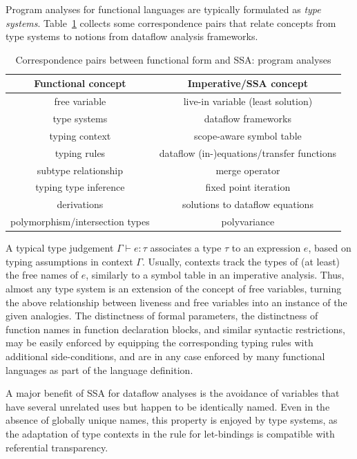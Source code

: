 Program analyses for functional languages are typically formulated as
\emph{type systems}. Table~\ref{tableFunctionalCorrespondencesII} collects some
correspondence pairs that relate concepts from type systems to notions
from dataflow analysis frameworks.
\begin{table}
\begin{center}
\begin{tabular}{|c|c|}
  \hline Functional concept & Imperative/SSA concept\\ 
  \hline 
  free variable & live-in variable (least solution)\\
  type systems & dataflow frameworks\\
  typing context & scope-aware symbol table\\
  typing
  rules & dataflow (in-)equations/transfer functions\\
  subtype relationship & merge operator\\
  typing
  type inference & fixed point iteration\\
  derivations & solutions to dataflow equations\\
  polymorphism/intersection types & polyvariance\\
  \hline
\end{tabular}
\end{center}
\caption{\label{tableFunctionalCorrespondencesII}
  Correspondence pairs between functional form and SSA: program analyses}
\end{table}
 A typical type judgement $\Gamma
\vdash e:\tau$ 
associates a type $\tau$ to an expression $e$, based on typing
assumptions in context $\Gamma$. Usually, contexts track the types of
(at least) the free names of $e$, similarly to a symbol table in an
imperative analysis. Thus, almost any type system is an extension of
the concept of free variables, turning the above relationship between
liveness and free variables into an instance of the given
analogies. The distinctness of formal parameters, the distinctness of
function names in function declaration blocks, and similar syntactic
restrictions, may be easily enforced by equipping the corresponding
typing rules with additional side-conditions, and are in any case
enforced by many functional languages as part of the language
definition.

A major benefit of SSA for dataflow analyses is the avoidance of
variables that have several unrelated uses but happen to be
identically named.  Even in the absence of globally unique names, this
property is enjoyed by type systems, as the adaptation of type
contexts in the rule for let-bindings is compatible with referential
transparency.

